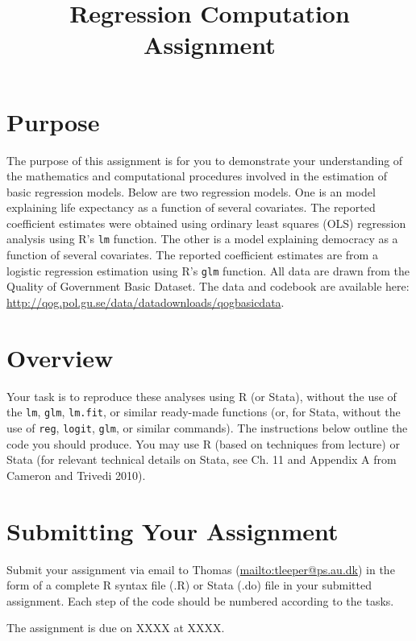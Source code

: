 \documentclass[a4paper,11pt]{article}
\title{Regression Computation Assignment}
\author{}
\date{}
\begin{document}
\maketitle

{\onehalfspacing

\section*{Purpose}

The purpose of this assignment is for you to demonstrate your understanding of the mathematics and computational procedures involved in the estimation of basic regression models. Below are two regression models. One is an model explaining life expectancy as a function of several covariates. The reported coefficient estimates were obtained using ordinary least squares (OLS) regression analysis using R's \texttt{lm} function. The other is a model explaining democracy as a function of several covariates. The reported coefficient estimates are from a logistic regression estimation using R's \texttt{glm} function. All data are drawn from the Quality of Government Basic Dataset. The data and codebook are available here: \url{http://qog.pol.gu.se/data/datadownloads/qogbasicdata}.

\section*{Overview}

Your task is to reproduce these analyses using R (or Stata), without the use of the \texttt{lm}, \texttt{glm}, \texttt{lm.fit}, or similar ready-made functions (or, for Stata, without the use of \texttt{reg}, \texttt{logit}, \texttt{glm}, or similar commands). The instructions below outline the code you should produce. You may use R (based on techniques from lecture) or Stata (for relevant technical details on Stata, see Ch. 11 and Appendix A from Cameron and Trivedi 2010).
}

\section*{Submitting Your Assignment}

\noindent Submit your assignment via email to Thomas (\url{mailto:tleeper@ps.au.dk}) in the form of a complete R syntax file (.R) or Stata (.do) file in your submitted assignment. Each step of the code should be numbered according to the tasks.

\vspace{1em}
\noindent The assignment is due on XXXX at XXXX.
\end{document}
